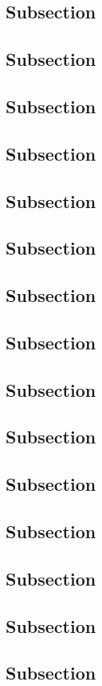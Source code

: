 \documentclass[paper=a5,twoside,fontsize=10pt, DIV=calc, headings=small,bibliography=totoc, listof=totoc]{scrbook}
\begin{document}
\subsection{Subsection}
\subsection{Subsection}
\subsection{Subsection}
\subsection{Subsection}
\subsection{Subsection}
\subsection{Subsection}
\subsection{Subsection}
\subsection{Subsection}
\subsection{Subsection}
\subsection{Subsection}
\subsection{Subsection}
\subsection{Subsection}
\subsection{Subsection}
\subsection{Subsection}
\subsection{Subsection}
\end{document}
